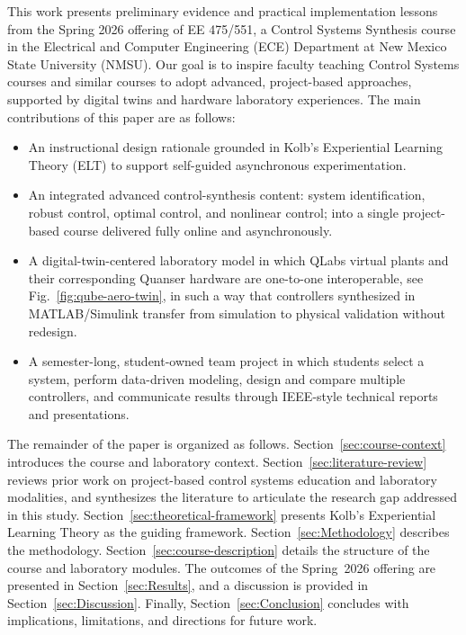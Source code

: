\documentclass[journal]{IEEEtran}
\begin{document}
This work presents preliminary evidence and practical implementation lessons from the Spring 2026 offering of EE 475/551, a Control Systems Synthesis course in the Electrical and Computer Engineering (ECE) Department at New Mexico State University (NMSU). Our goal is to inspire faculty teaching Control Systems courses and similar courses to adopt advanced, project-based approaches, supported by digital twins and hardware laboratory experiences.%
The main contributions of this paper are as follows:
\begin{itemize}
\item %
An instructional design rationale grounded in Kolb's Experiential Learning Theory (ELT) to support self-guided asynchronous experimentation.
\item %
An integrated advanced control-synthesis content: system identification, robust control, optimal control, and nonlinear control; into a single project-based course delivered fully online and asynchronously.
\item %
A digital-twin-centered laboratory model in which QLabs virtual plants and their corresponding Quanser hardware are one-to-one interoperable, see Fig.~\ref{fig:qube-aero-twin}, in such a way that controllers synthesized in MATLAB/Simulink transfer from simulation to physical validation without redesign.
\item %
A semester-long, student-owned team project in which students select a system, perform data-driven modeling, design and compare multiple controllers, and communicate results through IEEE-style technical reports and presentations.
\end{itemize}

\medskip

The remainder of the paper is organized as follows. Section~\ref{sec:course-context} introduces the course and laboratory context. Section~\ref{sec:literature-review} reviews prior work on project-based control systems education and laboratory modalities, and %
synthesizes the literature to articulate the research gap addressed in this study. Section~\ref{sec:theoretical-framework} presents Kolb's Experiential Learning Theory as the guiding framework. Section~\ref{sec:Methodology} describes the methodology. Section~\ref{sec:course-description} details the structure of the course and laboratory modules. The outcomes of the Spring~2026 offering are presented in Section~\ref{sec:Results}, and a discussion is provided in Section~\ref{sec:Discussion}. Finally, Section~\ref{sec:Conclusion} concludes with implications, limitations, and directions for future work.
\end{document}
